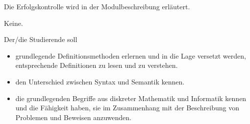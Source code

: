 \begin{course}

\setdoclanguagegerman
{}



\coursehead


\label{cour_6187.dp_997}


\begin{styleenv}
\begin{assessment}
Die Erfolgskontrolle wird in der Modulbeschreibung erläutert.


\end{assessment}

\begin{conditions}Keine.\end{conditions}


\end{styleenv}

\begin{learningoutcomes}
Der/die Studierende soll

 \begin{itemize}\item grundlegende Definitionsmethoden erlernen und in die Lage versetzt werden, entsprechende Definitionen zu lesen und zu verstehen.  \item den Unterschied zwischen Syntax und Semantik kennen.  \item die grundlegenden Begriffe aus diskreter Mathematik und Informatik kennen und die Fähigkeit haben, sie im Zusammenhang mit der Beschreibung von Problemen und Beweisen anzuwenden.  \end{itemize}
\end{learningoutcomes}


\end{course}
